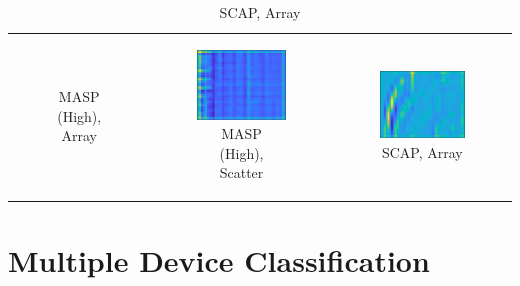 {\begin{table}[tb]
\begin{tabular}{ccc}
\begin{subfigure}{0.3\textwidth}
		\caption{MASP (High), Array}\label{fig:cnnfc13}
		\end{subfigure}&
		\begin{subfigure}{0.3\textwidth}\centering\includegraphics[width=0.8\columnwidth]{./dasp_algorithm_results/dasp_cnn_single_dream_fc_14.eps}
		\caption{MASP (High), Scatter}\label{fig:cnnfc14}
		\end{subfigure}&
		\begin{subfigure}{0.3\textwidth}\centering\includegraphics[width=0.8\columnwidth]{./dasp_algorithm_results/dasp_cnn_single_dream_fc_17.eps}
		\caption{SCAP, Array}\label{fig:cnnfc17}
		\end{subfigure}
	\end{tabular}
\label{tab:cnn_fc_dream_table}
\end{table}
}

\section[Multiple Device Classification]{Multiple Device Classification}
\label{Multiple Device Classification}

